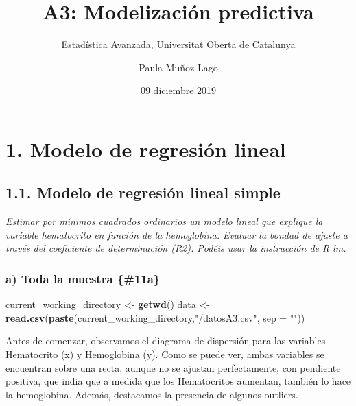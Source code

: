 \documentclass[]{article}
\title{A3: Modelización predictiva}
\subtitle{Estadística Avanzada, Universitat Oberta de Catalunya}
\author{Paula Muñoz Lago}
\date{09 diciembre 2019}
\newenvironment{Shaded}{\begin{snugshade}}{\end{snugshade}}
\newcommand{\DataTypeTok}[1]{\textcolor[rgb]{0.13,0.29,0.53}{#1}}
\newcommand{\KeywordTok}[1]{\textcolor[rgb]{0.13,0.29,0.53}{\textbf{#1}}}
\newcommand{\NormalTok}[1]{#1}
\newcommand{\OperatorTok}[1]{\textcolor[rgb]{0.81,0.36,0.00}{\textbf{#1}}}
\newcommand{\StringTok}[1]{\textcolor[rgb]{0.31,0.60,0.02}{#1}}
\begin{document}
\maketitle

{
\setcounter{tocdepth}{2}
\tableofcontents
}
\hypertarget{modelo-de-regresiuxf3n-lineal}{%
\section{1. Modelo de regresión
lineal}\label{modelo-de-regresiuxf3n-lineal}}

\hypertarget{modelo-de-regresiuxf3n-lineal-simple}{%
\subsection{1.1. Modelo de regresión lineal
simple}\label{modelo-de-regresiuxf3n-lineal-simple}}

\emph{Estimar por mínimos cuadrados ordinarios un modelo lineal que
explique la variable hematocrito en función de la hemoglobina. Evaluar
la bondad de ajuste a través del coeficiente de determinación (R2).
Podéis usar la instrucción de R lm.}

\hypertarget{a-toda-la-muestra-11a}{%
\subsubsection{a) Toda la muestra
\{\#11a\}}\label{a-toda-la-muestra-11a}}

\begin{Shaded}
\begin{Highlighting}[]
\NormalTok{current_working_directory <-}\StringTok{ }\KeywordTok{getwd}\NormalTok{()}
\NormalTok{data <-}\StringTok{ }\KeywordTok{read.csv}\NormalTok{(}\KeywordTok{paste}\NormalTok{(current_working_directory,}\StringTok{"/datosA3.csv"}\NormalTok{, }\DataTypeTok{sep =} \StringTok{""}\NormalTok{))}
\end{Highlighting}
\end{Shaded}

Antes de comenzar, observamos el diagrama de dispersión para las
variables Hematocrito (x) y Hemoglobina (y). Como se puede ver, ambas
variables se encuentran sobre una recta, aunque no se ajustan
perfectamente, con pendiente positiva, que india que a medida que los
Hematocritos aumentan, también lo hace la hemoglobina. Además,
destacamos la presencia de algunos outliers.

\begin{Shaded}
\end{Shaded}
\end{document}
